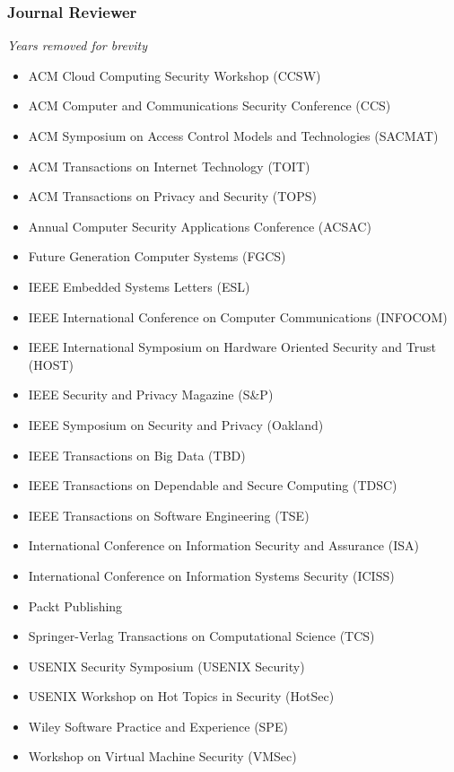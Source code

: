 \hypertarget{journal-reviews}{%
\subsubsection{Journal Reviewer}\label{journal-reviews}}
\small{\textit{Years removed for brevity}}
\begin{itemize}
\tightlist
\item ACM Cloud Computing Security Workshop (CCSW)
\item ACM Computer and Communications Security Conference (CCS)
\item ACM Symposium on Access Control Models and Technologies (SACMAT)
\item ACM Transactions on Internet Technology (TOIT)
\item ACM Transactions on Privacy and Security (TOPS)
\item Annual Computer Security Applications Conference (ACSAC)
\item Future Generation Computer Systems (FGCS)
\item IEEE Embedded Systems Letters (ESL)
\item IEEE International Conference on Computer Communications (INFOCOM)
\item IEEE International Symposium on Hardware Oriented Security and Trust (HOST)
\item IEEE Security and Privacy Magazine (S\&P)
\item IEEE Symposium on Security and Privacy (Oakland)
\item IEEE Transactions on Big Data (TBD)
\item IEEE Transactions on Dependable and Secure Computing (TDSC)
\item IEEE Transactions on Software Engineering (TSE)
\item International Conference on Information Security and Assurance (ISA)
\item International Conference on Information Systems Security (ICISS)
\item Packt Publishing
\item Springer-Verlag Transactions on Computational Science (TCS)
\item USENIX Security Symposium (USENIX Security)
\item USENIX Workshop on Hot Topics in Security (HotSec)
\item Wiley Software Practice and Experience (SPE)
\item Workshop on Virtual Machine Security (VMSec)
\end{itemize}

